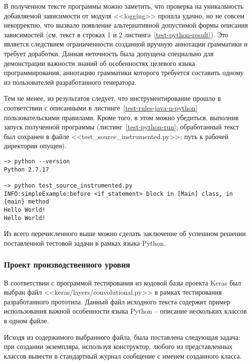 В полученном тексте программы можно заметить, что проверка на уникальность добавляемой зависимости от модуля <<logging>> прошла удачно, но не совсем некорректно, что вызвало появление альтернативной допустимой формы описания зависимостей (см. текст в строках 1 и 2 листинга~\ref{test-python-result}).
Это является следствием ограниченности созданной вручную аннотации грамматики и требует доработки.
Данная неточность была допущена специально для демонстрации важности знаний об особенностях целевого языка программирования, аннотацию грамматики которого требуется составить одному из пользователей разработанного генератора.

Тем не менее, из результатов следует, что инструментирование прошло в соответствии с описанными в листинге~\ref{test-rules-java-n-python} пользовательскими правилами.
Кроме того, в этом можно убедиться, выполнив запуск полученной программы (листинг~\ref{test-python-run}; обработанный текст был сохранен в файле <<test\_source\_instrumented.py>>; путь к рабочей директории опущен).

\begin{lstlisting}[frame=single, label={test-python-run}, caption={Результаты запуска обработанного тестового приложения.}]
~> python --version
Python 2.7.17

~> python test_source_instrumented.py
INFO:simpleExample:before <if_statement> block in [Main] class, in {main} method
Hello World!
Hello World!
\end{lstlisting}

Из всего перечисленного выше можно сделать заключение об успешном решении поставленной тестовой задачи в рамках языка Python.

\subsubsection{Проект производственного уровня}

В соответствии с программой тестирования из кодовой базы проекта Keras был выбран файл <<keras/layers/convolutional.py>> в рамках тестирования разработанного прототипа.
Данный файл исходного текста содержит пример использования важной особенности языка Python -- описание нескольких классов в одном файле.

Исходя из содержимого выбранного файла, была поставлена следующая задача:
при создании экземпляра, используя конструктор, любого из представленных классов вывести в стандартный журнал сообщение с именем созданного класса.

